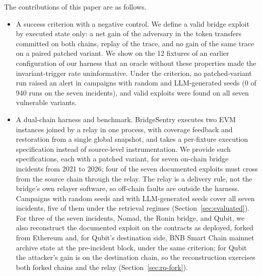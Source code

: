 \documentclass[a4paper]{cas-sc}
\begin{document}
The contributions of this paper are as follows.
\begin{itemize}
    \item A success criterion with a negative control. We define a valid bridge exploit by executed state only: a net gain of the adversary in the token transfers committed on both chains, replay of the trace, and no gain of the same trace on a paired patched variant. We show on the 12 fixtures of an earlier configuration of our harness that an oracle without these properties made the invariant-trigger rate uninformative. Under the criterion, no patched-variant run raised an alert in campaigns with random and LLM-generated seeds (0 of 940 runs on the seven incidents), and valid exploits were found on all seven vulnerable variants.
    \item A dual-chain harness and benchmark. BridgeSentry executes two EVM instances joined by a relay in one process, with coverage feedback and restoration from a single global snapshot, and takes a per-fixture execution specification instead of source-level instrumentation. We provide such specifications, each with a patched variant, for seven on-chain bridge incidents from 2021 to 2026; four of the seven documented exploits must cross from the source chain through the relay. The relay is a delivery rule, not the bridge's own relayer software, so off-chain faults are outside the harness. Campaigns with random seeds and with LLM-generated seeds cover all seven incidents, five of them under the retrieval regimes (Section~\ref{sec:evaluated}). For three of the seven incidents, Nomad, the Ronin bridge, and Qubit, we also reconstruct the documented exploit on the contracts as deployed, forked from Ethereum and, for Qubit's destination side, BNB Smart Chain mainnet archive state at the pre-incident block, under the same criterion; for Qubit the attacker's gain is on the destination chain, so the reconstruction exercises both forked chains and the relay (Section~\ref{sec:rq-fork}).

\end{itemize}
\end{document}
